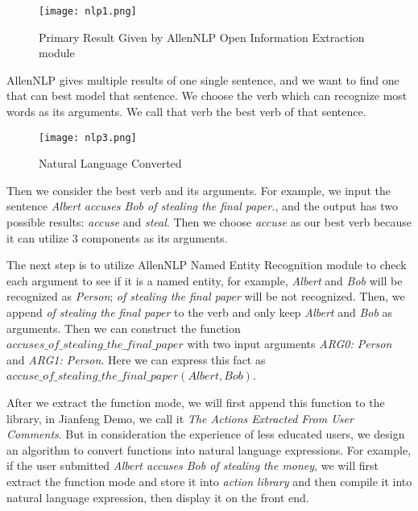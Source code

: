 \documentclass[
12pt, %
a4paper, %
oneside, %
headinclude,footinclude, %
BCOR5mm, %
]{scrartcl}
\begin{document}
\begin{figure}[htb]
    \centering 
    \texttt{[image: nlp1.png]} 
    \caption[Primary Result Given by AllenNLP Open Information Extraction module]{Primary Result Given by AllenNLP Open Information Extraction module} 
    \end{figure}

AllenNLP gives multiple results of one single sentence, and we want to find one that can best model that sentence. We choose the verb which can recognize most words as its arguments. We call that verb the best verb of that sentence. 

\begin{figure}[htb]
    \centering 
    \texttt{[image: nlp3.png]} 
    \caption[Natural Language Converted]{Natural Language Converted} 
    \end{figure}
    
Then we consider the best verb and its arguments. For example, we input the sentence \textit{Albert accuses Bob of stealing the final paper.}, and the output has two possible results: \textit{accuse} and \textit{steal}. Then we choose \textit{accuse} as our best verb because it can utilize 3 components as its arguments.

The next step is to utilize AllenNLP Named Entity Recognition module to check each argument to see if it is a named entity, for example, \textit{Albert} and \textit{Bob} will be recognized as \textit{Person}; \textit{of stealing the final paper} will be not recognized. Then, we append \textit{of stealing the final paper} to the verb and only keep \textit{Albert} and \textit{Bob} as arguments. Then we can construct the function $accuses\_of\_stealing\_the\_final\_paper$ with two input arguments \textit{ARG0: Person} and \textit{ARG1: Person}. Here we can express this fact as $accuse\_of\_stealing\_the\_final\_paper \left(Albert, Bob\right)$. 

After we extract the function mode, we will first append this function to the library, in Jianfeng Demo, we call it \textit{The Actions Extracted From User Comments}. But in consideration the experience of less educated users, we design an algorithm to convert functions into natural language expressions. For example, if the user submitted \textit{Albert accuses Bob of stealing the money}, we will first extract the function mode and store it into \textit{action library} and then compile it into natural language expression, then display it on the front end.
\end{document}
